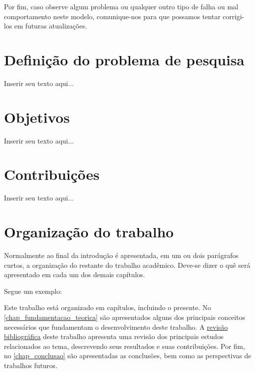 Por fim, caso observe algum problema ou qualquer outro tipo de falha ou mal comportamento neste modelo, comunique-nos para que possamos tentar corrigi-los em futuras atualizações.

\section{Definição do problema de pesquisa}
\label{sec_definicao_problema_pesquisa}

Inserir seu texto aqui...

\section{Objetivos}
\label{sec_objetivos}

Inserir seu texto aqui...

\section{Contribuições}
\label{sec_contribuicoes}

Inserir seu texto aqui...

\section{Organização do trabalho}
\label{sec_organizacao_trabalho}

Normalmente ao final da introdução é apresentada, em um ou dois parágrafos curtos, a organização do restante do trabalho acadêmico.
Deve-se dizer o quê será apresentado em cada um dos demais capítulos.

Segue um exemplo:

Este trabalho está organizado em capítulos, incluindo o presente.
No \autoref{chap_fundamentacao_teorica} são apresentados alguns dos principais conceitos necessários que fundamentam o desenvolvimento deste trabalho.
A \hyperref[chap_trabalhos_relacionados]{revisão bibliográfica} deste trabalho apresenta uma revisão dos principais estudos relacionados ao tema, descrevendo seus resultados e suas contribuições.
Por fim, no \autoref{chap_conclusao} são apresentadas as conclusões, bem como as perspectivas de trabalhos futuros.
